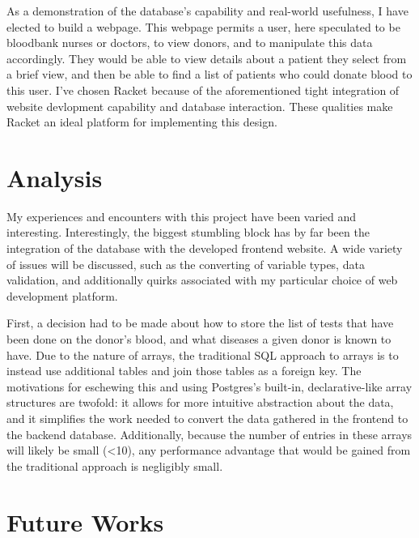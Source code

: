 \documentclass[runningheads,a4paper]{llncs}
\begin{document}
As a demonstration of the database's capability and real-world
usefulness, I have elected to build a webpage. This webpage permits a
user, here speculated to be bloodbank nurses or doctors, to view
donors, and to manipulate this data accordingly. They would be able to
view details about a patient they select from a brief view, and then
be able to find a list of patients who could donate blood to this
user.
I've chosen Racket because of the aforementioned tight integration of
website devlopment capability and database interaction. These
qualities make Racket an ideal platform for implementing this design.

\section{Analysis}\label{sec:analysis}
My experiences and encounters with this project have been varied and
interesting. Interestingly, the biggest stumbling block has by far
been the integration of the database with the developed frontend
website. A wide variety of issues will be discussed, such as the
converting of variable types, data validation, and additionally quirks
associated with my particular choice of web development platform.

First, a decision had to be made about how to store the list of tests
that have been done on the donor's blood, and what diseases a given
donor is known to have. Due to the nature of arrays, the traditional
SQL approach to arrays is to instead use additional tables and join
those tables as a foreign key. The motivations for eschewing this and
using Postgres's built-in, declarative-like array structures are
twofold: it allows for more intuitive abstraction about the data, and
it simplifies the work needed to convert the data gathered in the
frontend to the backend database. Additionally, because the number of
entries in these arrays will likely be small (<10), any performance
advantage that would be gained from the traditional approach is
negligibly small.
\section{Future Works}\label{sec:fworks}

\end{document}

